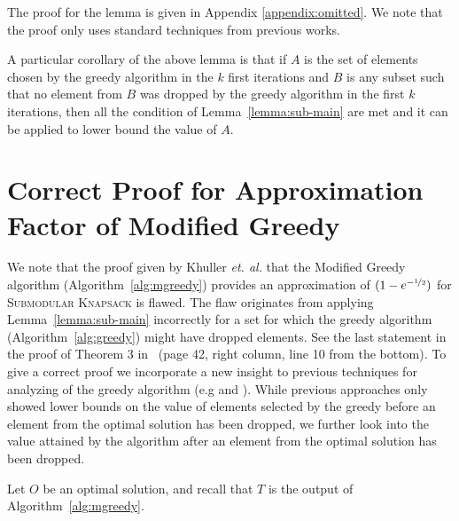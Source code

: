 \documentclass[a4paper,UKenglish,cleveref, autoref]{lipics-v2019}
\newcommand{\SK}{{\textsc{Submodular Knapsack}}\xspace}
\begin{document}
The proof for the lemma is given in Appendix  \ref{appendix:omitted}. We note that 
the proof only uses standard techniques from previous works.

A particular corollary of the above lemma is that if $A$ is the set of elements chosen by the greedy algorithm in
the $k$ first iterations and $B$ is any subset such that no element from $B$ was dropped by the greedy algorithm in the first $k$ iterations,
then all the condition of Lemma~\ref{lemma:sub-main} are met and it can be applied to lower bound the value of $A$.







\section{Correct Proof for Approximation Factor of Modified Greedy}\label{sec:ModifiedGreedy}
We note that the proof given by Khuller {\em et. al.} \cite{khuller1999budgeted} that the Modified Greedy algorithm (Algorithm~\ref{alg:mgreedy}) provides an approximation of $ (1-e^{-\nicefrac[]{1}{2}})$ for \SK is flawed.
{{The flaw originates from applying Lemma~\ref{lemma:sub-main} incorrectly for a set for which the greedy algorithm (Algorithm~\ref{alg:greedy}) might have dropped elements.
See the last statement in the proof of Theorem 3 in~\cite{khuller1999budgeted} (page 42, right column, line 10 from the bottom).}}
To give a correct proof we incorporate a new insight to
previous techniques for analyzing of the greedy algorithm
(e.g \cite{khuller1999budgeted} and \cite{LB10}). While previous approaches only
showed lower
bounds on the value of elements selected by the greedy before an
 element from the optimal solution has been dropped, we
further look into the value attained by the algorithm after
an element from the optimal solution has been dropped.

Let $O$ be an optimal solution, and recall that $T$ is the output of Algorithm~\ref{alg:mgreedy}.


\end{document}
